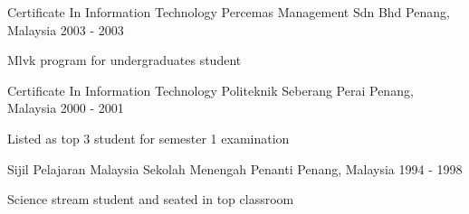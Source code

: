 

\begin{cventries}

  \cventry
    {Certificate In Information Technology} %
    {Percemas Management Sdn Bhd} %
    {Penang, Malaysia} %
    {2003 - 2003} %
    {
      \begin{cvitems} %
        \item {Mlvk program for undergraduates student}
      \end{cvitems}
    }
    
  \cventry
    {Certificate In Information Technology} %
    {Politeknik Seberang Perai} %
    {Penang, Malaysia} %
    {2000 - 2001} %
    {
      \begin{cvitems} %
        \item {Listed as top 3 student for semester 1 examination}
      \end{cvitems}
    }
    
    \cventry
    {Sijil Pelajaran Malaysia} %
    {Sekolah Menengah Penanti} %
    {Penang, Malaysia} %
    {1994 - 1998} %
    {
      \begin{cvitems} %
        \item {Science stream student and seated in top classroom}
      \end{cvitems}
    }

\end{cventries}
